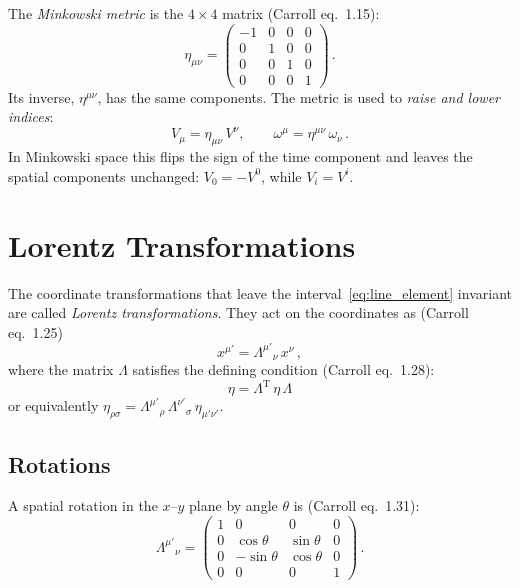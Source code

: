 The \emph{Minkowski metric} is the $4 \times 4$ matrix
(Carroll eq.~1.15):
\begin{equation}
    \eta_{\mu\nu} =
    \begin{pmatrix}
    -1 & 0 & 0 & 0 \\
     0 & 1 & 0 & 0 \\
     0 & 0 & 1 & 0 \\
     0 & 0 & 0 & 1
    \end{pmatrix} \,.
    \label{eq:minkowski_metric}
\end{equation}
Its inverse, $\eta^{\mu\nu}$, has the same components.  The metric is used to
\emph{raise and lower indices}:
\begin{equation}
    V_\mu = \eta_{\mu\nu}\, V^\nu, \qquad
    \omega^\mu = \eta^{\mu\nu}\, \omega_\nu \,.
    \label{eq:raise_lower}
\end{equation}
In Minkowski space this flips the sign of the time component and leaves
the spatial components unchanged: $V_0 = -V^0$, while $V_i = V^i$.


\section{Lorentz Transformations}
\label{sec:lorentz_transforms}

The coordinate transformations that leave the interval~\eqref{eq:line_element}
invariant are called \emph{Lorentz transformations}.  They act on the
coordinates as (Carroll eq.~1.25)
\begin{equation}
    x^{\mu'} = \Lambda^{\mu'}{}_{\nu}\, x^\nu \,,
    \label{eq:lorentz_transform}
\end{equation}
where the matrix $\Lambda$ satisfies the defining condition
(Carroll eq.~1.28):
\begin{equation}
    \boxed{
    \eta = \Lambda^{\mathrm{T}}\, \eta\, \Lambda
    }
    \label{eq:lorentz_condition}
\end{equation}
or equivalently $\eta_{\rho\sigma} = \Lambda^{\mu'}{}_\rho\,
\Lambda^{\nu'}{}_\sigma\, \eta_{\mu'\nu'}$.

\subsection{Rotations}

A spatial rotation in the $x$--$y$ plane by angle $\theta$ is
(Carroll eq.~1.31):
\begin{equation}
    \Lambda^{\mu'}{}_\nu =
    \begin{pmatrix}
    1 & 0 & 0 & 0 \\
    0 & \cos\theta & \sin\theta & 0 \\
    0 & -\sin\theta & \cos\theta & 0 \\
    0 & 0 & 0 & 1
    \end{pmatrix} \,.
    \label{eq:rotation}
\end{equation}


